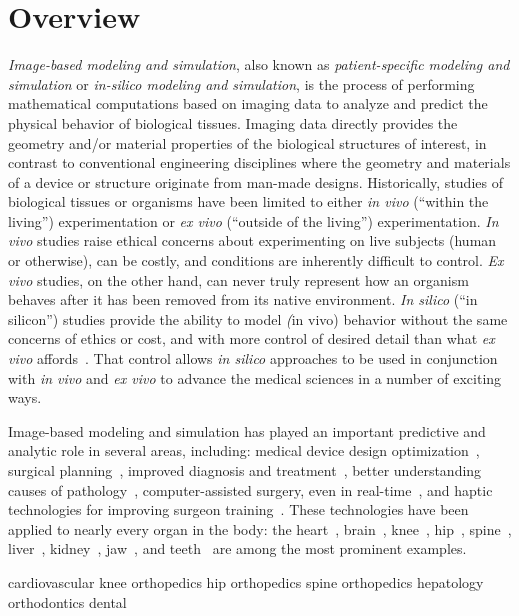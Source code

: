 \chapter{Overview}
%

\textit{Image-based modeling and simulation}, also known as \textit{patient-specific modeling and simulation} or \textit{in-silico modeling and simulation}, is the process of performing mathematical computations based on imaging data to analyze and predict the physical behavior of biological tissues. Imaging data directly provides the geometry and/or material properties of the biological structures of interest, in contrast to conventional engineering disciplines where the geometry and materials of a device or structure originate from man-made designs. Historically, studies of biological tissues or organisms have been limited to either \textit{in vivo} (``within the living'') experimentation or \textit{ex vivo} (``outside of the living'') experimentation. \textit{In vivo} studies raise ethical concerns about experimenting on live subjects (human or otherwise), can be costly, and conditions are inherently difficult to control. \textit{Ex vivo} studies, on the other hand, can never truly represent how an organism behaves after it has been removed from its native environment. \textit{In silico} (``in silicon'') studies provide the ability to model \textit(in vivo) behavior without the same concerns of ethics or cost, and with more control of desired detail than what \textit{ex vivo} affords~\cite{colquitt_2011}. That control allows \textit{in silico} approaches to be used in conjunction with \textit{in vivo} and \textit{ex vivo} to advance the medical sciences in a number of exciting ways.


Image-based modeling and simulation has played an important predictive and analytic role in several areas, including:  medical device design optimization~\cite{},  surgical planning~\cite{}, improved diagnosis and treatment~\cite{}, better understanding causes of pathology~\cite{}, computer-assisted surgery, even in real-time~\cite{}, and haptic technologies for improving surgeon training~\cite{}. These technologies have been applied to nearly every organ in the body: the heart~\cite{}, brain~\cite{}, knee~\cite{}, hip~\cite{}, spine~\cite{}, liver~\cite{}, kidney~\cite{}, jaw~\cite{}, and teeth~\cite{} are among the most prominent examples.

cardiovascular
knee orthopedics
hip orthopedics
spine orthopedics
hepatology
orthodontics
dental


